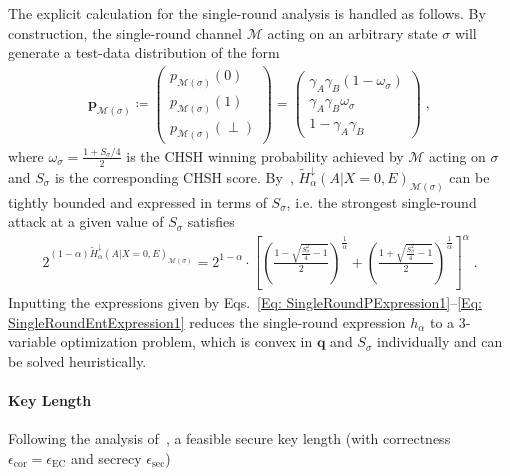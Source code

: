 \documentclass[aps,reprint,showpacs,superscriptaddress]{revtex4-2}
\newcommand{\vect}[1]{\mathbf{#1}}
\begin{document}
The explicit calculation for the single-round analysis is handled as follows. By construction, the single-round channel $\mathcal{M}$ acting on an arbitrary state $\sigma$ will generate a test-data distribution of the form
\begin{align} \label{Eq: SingleRoundPExpression1}
\vect{p}_{\mathcal{M}(\sigma)} \coloneqq \begin{pmatrix}
p_{\mathcal{M}(\sigma)} (0) \\
p_{\mathcal{M}(\sigma)} (1) \\
p_{\mathcal{M}(\sigma)} (\perp)
\end{pmatrix}= \begin{pmatrix}
\gamma_{A}\gamma_{B} \left(1-\omega_{\sigma}\right) \\
\gamma_{A}\gamma_{B} \omega_{\sigma} \\
1-\gamma_{A}\gamma_{B}
\end{pmatrix} \;,
\end{align}
where $\omega_{\sigma}=\frac{1+S_{\sigma}/4}{2}$ is the CHSH winning probability achieved by $\mathcal{M}$ acting on $\sigma$ and $S_{\sigma}$ is the corresponding CHSH score. By~\cite{hahn2025analytic}, $\widetilde{H}_{\alpha}^{\downarrow}\left( A|X=0,E\right)_{\mathcal{M}(\sigma)}$ can be tightly bounded and expressed in terms of $S_{\sigma}$, i.e. the strongest single-round attack at a given value of $S_{\sigma}$ satisfies
\begin{align} \label{Eq: SingleRoundEntExpression1}
2^{\left(1-\alpha\right)\widetilde{H}_{\alpha}^{\downarrow}\left( A|X=0, E\right)_{\mathcal{M}(\sigma)}} = 2^{1-\alpha} \cdot \left[ \left(\frac{1-\sqrt{\frac{S_{\sigma}^{2}}{4}-1}}{2} \right)^{\frac{1}{\alpha}}+ \left(\frac{1+\sqrt{\frac{S_{\sigma}^{2}}{4}-1}}{2} \right)^{\frac{1}{\alpha}}\right]^\alpha \; .
\end{align}
Inputting the expressions given by Eqs.~\eqref{Eq: SingleRoundPExpression1}--\eqref{Eq: SingleRoundEntExpression1} reduces the single-round expression $h_{\alpha}$  to a $3$-variable optimization problem, which is convex in $\vect{q}$ and $S_{\sigma}$ individually and can be solved heuristically.






\paragraph{Key Length}
Following the analysis of~\cite{hahn2025analytic}, a feasible secure key length (with correctness $\epsilon_{\mathrm{cor}} = \epsilon_{\mathrm{EC}}$ and secrecy $\epsilon_{\mathrm{sec}}$)
\end{document}
